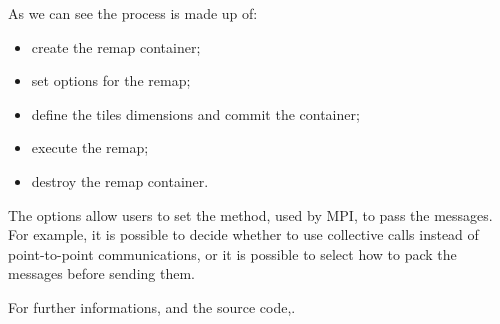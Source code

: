 As we can see the process is made up of:
\begin{itemize}
\item create the remap container;
\item set options for the remap;
\item define the tiles dimensions and commit the container;
\item execute the remap;
\item destroy the remap container.
\end{itemize}
\par
The options allow users to set the method, used by MPI, to pass the messages. For example, it is possible to decide whether to use collective calls instead of point-to-point communications, or it is possible to select how to pack the messages before sending them.
\par
For further informations, and the source code,\cite{fftMPI}.
